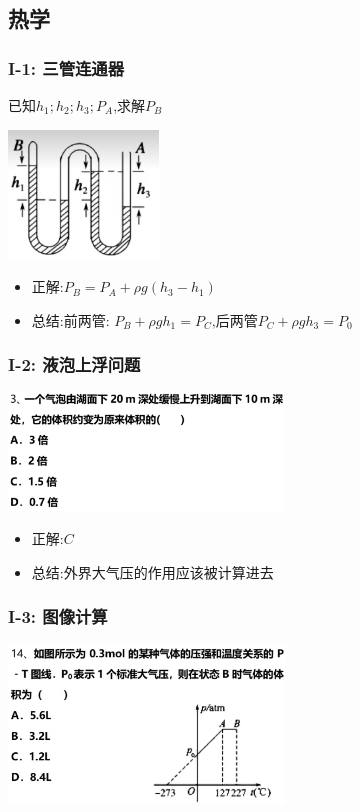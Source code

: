 \documentclass{article}
\begin{document}
\subsection{热学}
\subsubsection{I-1: 三管连通器}
已知$h_{1};h_{2};h_{3};P_{A}$,求解$P_{B}$

\includegraphics[width = 0.3\textwidth,keepaspectratio]{./pictures/2.3-1.png}
\begin{itemize}
    \item 正解:\quad $P_{B} = P_{A} + \rho g (h_{3} - h_{1}) $
    \item 总结:\quad 前两管: $ P_{B} + \rho g h_{1} = P_{C}\text{,后两管} P_{C} + \rho g h_{3} = P_{0}$

\end{itemize}

\vspace{2em}

\subsubsection{I-2: 液泡上浮问题}
\includegraphics[width = 0.55\textwidth,keepaspectratio]{./pictures/2.3-2.png}

\begin{itemize}
    \item 正解:\quad $C$
    \item 总结:\quad 外界大气压的作用应该被计算进去
\end{itemize}

\vspace{2em}

\subsubsection{I-3: 图像计算}
\includegraphics[width = 0.55\textwidth,keepaspectratio]{./pictures/2.3-3.png}
\end{document}
